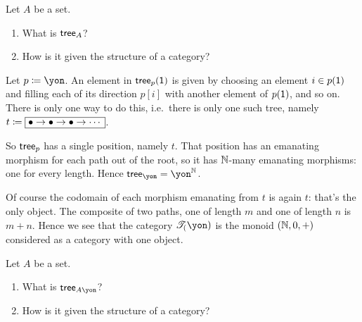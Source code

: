 \documentclass[Book-Poly]{subfiles}
\begin{document}
\begin{exercise}
Let $A$ be a set.
\begin{enumerate}
	\item What is $\mathsf{tree}_A$? 
	\item How is it given the structure of a category?
\qedhere
\end{enumerate}
\end{exercise}

\begin{example}
Let $p\coloneqq\yon$. An element in $\mathsf{tree}_p(\textsf{1})$ is given by choosing an element $i\in p(\textsf{1})$ and filling each of its direction $p[i]$ with another element of $p(\textsf{1})$, and so on. There is only one way to do this, i.e.\ there is only one such tree, namely $t\coloneqq\fbox{$\bullet\to\bullet\to\bullet\to\cdots$}$.

So $\mathsf{tree}_p$ has a single position, namely $t$. That position has an emanating morphism for each path out of the root, so it has $\mathbb{N}$-many emanating morphisms: one for every length. Hence $\tr_\yon=\yon^\nn$.

Of course the codomain of each morphism emanating from $t$ is again $t$: that's the only object. The composite of two paths, one of length $m$ and one of length $n$ is $m+n$. Hence we see that the category $\cofree(\yon)$ is the monoid $(\mathbb{N},0,+)$ considered as a category with one object.
\end{example}

\begin{exercise}
Let $A$ be a set.
\begin{enumerate}
	\item What is $\tr_{A\yon}$? 
	\item How is it given the structure of a category?
\qedhere
\end{enumerate}
\end{exercise}
\end{document}
